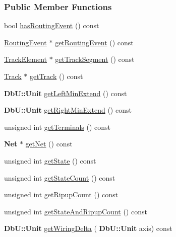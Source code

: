 \subsubsection*{Public Member Functions}
\begin{DoxyCompactItemize}
\item 
bool \mbox{\hyperlink{classKite_1_1DataNegociate_abeeeb06293c85a902f2b56d1b13d260d}{has\+Routing\+Event}} () const
\item 
\mbox{\hyperlink{classKite_1_1RoutingEvent}{Routing\+Event}} $\ast$ \mbox{\hyperlink{classKite_1_1DataNegociate_a831dab8eb708da17b4f1e1a8c057f283}{get\+Routing\+Event}} () const
\item 
\mbox{\hyperlink{classKite_1_1TrackElement}{Track\+Element}} $\ast$ \mbox{\hyperlink{classKite_1_1DataNegociate_abc97e384245eab238831f9461968025b}{get\+Track\+Segment}} () const
\item 
\mbox{\hyperlink{classKite_1_1Track}{Track}} $\ast$ \mbox{\hyperlink{classKite_1_1DataNegociate_a3f34f9139b8491a0adb531ac3a904171}{get\+Track}} () const
\item 
\textbf{ Db\+U\+::\+Unit} \mbox{\hyperlink{classKite_1_1DataNegociate_a56149c72d0bfe5e33795782b646061b1}{get\+Left\+Min\+Extend}} () const
\item 
\textbf{ Db\+U\+::\+Unit} \mbox{\hyperlink{classKite_1_1DataNegociate_abf06c826acae81494b01b904d3277cc1}{get\+Right\+Min\+Extend}} () const
\item 
unsigned int \mbox{\hyperlink{classKite_1_1DataNegociate_a4f6fbcee2499d33394ab54f856c500c0}{get\+Terminals}} () const
\item 
\textbf{ Net} $\ast$ \mbox{\hyperlink{classKite_1_1DataNegociate_a692492374623a5c6096b2c4a51190359}{get\+Net}} () const
\item 
unsigned int \mbox{\hyperlink{classKite_1_1DataNegociate_a40ec2b23684a0e6e6d7ac9783a269037}{get\+State}} () const
\item 
unsigned int \mbox{\hyperlink{classKite_1_1DataNegociate_a6ad2b700f668f8e2e5cd4fbc717d8765}{get\+State\+Count}} () const
\item 
unsigned int \mbox{\hyperlink{classKite_1_1DataNegociate_a9832198737bd835fab730ff2b95bbfa0}{get\+Ripup\+Count}} () const
\item 
unsigned int \mbox{\hyperlink{classKite_1_1DataNegociate_acdd169f3bd670279f0a891caa809f99a}{get\+State\+And\+Ripup\+Count}} () const
\item 
\textbf{ Db\+U\+::\+Unit} \mbox{\hyperlink{classKite_1_1DataNegociate_af920f8ca7404239772e56d00f779cac6}{get\+Wiring\+Delta}} (\textbf{ Db\+U\+::\+Unit} axis) const

\end{DoxyCompactItemize}
